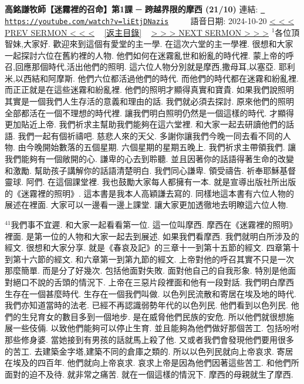 \documentclass{book}
\begin{document}
\section{}
\label{sec:liEtjDNazis}
\textbf{高銘謙牧師【迷霧裡的召命】第1課 ─ 跨越界限的摩西 (21/10)}
\newline
\newline
連結: \href{https://youtube.com/watch?v=liEtjDNazis}{\texttt{ https://youtube.com/watch?v=liEtjDNazis}} ~~~~ 語音日期: 2024-10-20 
\newline
\newline
\hyperref[sec:GvsPo_gDoyw]{\small{< < < PREV SERMON < < <}}
~
\hyperref[sec:index]{\small{[返主目錄]}}
~
\hyperref[sec:djNxJ0pc_CU]{\small{> > > NEXT SERMON > > >}}
\newline
\newline
$^{1}$各位頂智妹,大家好.
歡迎來到這個有愛堂的主一學.
在這次六堂的主一學裡.
很想和大家一起探討六位在舊約裡的人物.
他們如何在迷霧亂世和紛亂的時代裡.
蒙上帝的呼召,回應那個時代,活出他們的照明.
這六位人物分別就是摩西,撒母耳,以塞亞.
耶利米,以西結和阿摩斯.
他們六位都活過他們的時代.
而他們的時代都在迷霧和紛亂裡.
而正正就是在這些迷霧和紛亂裡.
他們的照明才顯得真實和寶貴.
如果我們說照明其實是一個我們人生存活的意義和理由的話.
我們就必須去探討.
原來他們的照明全部都活在一個不理想的時代裡.
讓我們明白照明仍然是一個這樣的時代.
才顯得更加貼近上帝.
我們祈求主幫助我們能夠在這六堂裡.
和大家一起去研讀他們的話語.
我們一起有個祈禱吧.
慈悲人來的天父.
多謝你讓我們今晚一同去看不同的人物.
由今晚開始數落的五個星期.
六個星期的星期五晚上.
我們祈求主帶領我們.
讓我們能夠有一個敞開的心.
謙卑的心去到聆聽.
並且因著你的話語得著生命的改變和激勵.
幫助孩子講解你的話語清楚明白.
我們同心謙卑.
領受禱告.
祈奉耶穌基督靈球.
阿們.
在這個課堂裡.
我也鼓勵大家每人都擁有一本.
就是宣導出版社所出版的《迷霧裡的照明》.
這本書是我本人高穎謙去寫的.
同樣地這本書有六位人物的展述在裡面.
大家可以一邊看一邊上課堂.
讓大家更加透徹地去明瞭這六位人物.

$^{41}$我們事不宜遲.
和大家一起看看第一位.
這一位叫摩西.
摩西在《迷霧裡的照明》裡面.
是第一位的人物和大家一起去到展述.
如果我們看摩西.
我們就明白所涉及的經文.
很想和大家分享.
就是《春哀及記》的三章十一到第十五節的經文.
四章第十到第十六節的經文.
和六章第一到第九節的經文.
上帝對他的呼召其實不只是一次那麼簡單.
而是分了好幾次.
包括他面對失敗.
面對他自己的自我形象.
特別是他面對絕口不說的舌頭的情況下.
上帝在三惡片段裡面和他有一段對話.
我們明白摩西生存在一個甚麼時代.
生存在一個我們叫做.
以色列民流散和寄居在埃及地的時代.
我們亦知道當時的法老.
已經不再認識弱勢年代的以色列民.
他們看到以色列民.
他們的生兒育女的數目多到一個地步.
是在威脅他們民族的安危.
所以他們就很想施展一些伎倆.
以致他們能夠可以停止生育.
並且能夠為他們做好那個苦工.
包括吩咐那些修身婆.
當她接到有男孩的話就馬上殺了他.
又或者我們會發現他們要用很多的苦工.
去建築金字塔,建築不同的倉庫之類的.
所以以色列民就向上帝哀求.
寄居在埃及的四百年.
他們就向上帝哀求.
哀求上帝是因為他們因著這些苦工.
和他們所面對的迫不及待.
就非常之痛苦.
就在一個這樣的情況下.
摩西的母親就生了摩西.
\end{document}

